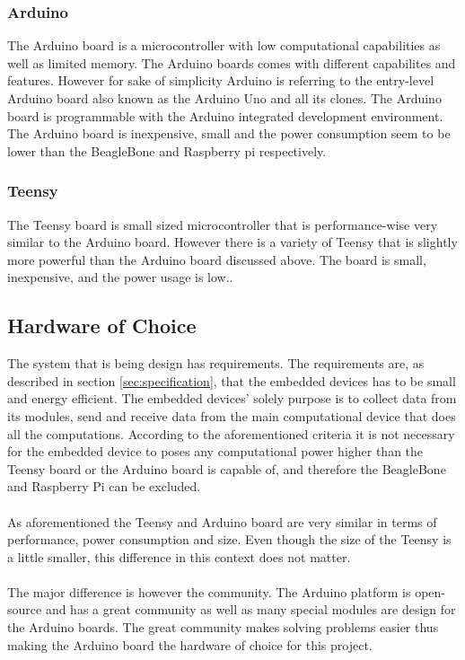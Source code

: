 \subsubsection{Arduino}
The Arduino board is a microcontroller with low computational capabilities as well as limited memory. The Arduino boards comes with different capabilites and features. However for sake of simplicity Arduino is referring to the entry-level Arduino board also known as the Arduino Uno and all its clones. The Arduino board is programmable with the Arduino integrated development environment. The Arduino board is inexpensive, small and the power consumption seem to be lower than the  BeagleBone and Raspberry pi respectively\cite{power_usage_ard}. 

\subsubsection{Teensy}
The Teensy board is small sized microcontroller that is performance-wise very similar to the Arduino board. However there is a variety of Teensy that is slightly more powerful than the Arduino board discussed above. The board is small, inexpensive, and the power usage is low.\cite{power_usage_teen}.

\subsection{Hardware of Choice}
The system that is being design has requirements. The requirements are, as described in section \ref{sec:specification}, that the embedded devices has to be small and energy efficient. The embedded devices' solely purpose is to collect data from its modules, send and receive data from the main computational device that does all the computations. According to the aforementioned criteria it is not necessary for the embedded device to poses any computational power higher than the Teensy board or the Arduino board is capable of, and therefore the BeagleBone and Raspberry Pi can be excluded. 
\\\\
As aforementioned the Teensy and Arduino board are very similar in terms of performance, power consumption and size. Even though the size of the Teensy is a little smaller, this difference in this context does not matter.
\\\\
The major difference is however the community. The Arduino platform is open-source and has a great community as well as many special modules are design for the Arduino boards. The great community makes solving problems easier thus making the Arduino board the hardware of choice for this project.

